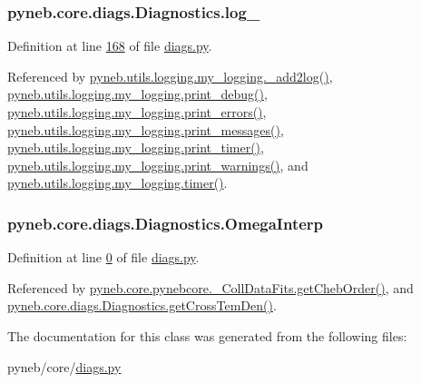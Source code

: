 \hypertarget{classpyneb_1_1core_1_1diags_1_1_diagnostics_a20b70abfa1fd458af2b797e06da01ed0}{
\subsubsection[{log\-\_\-}]{\setlength{\rightskip}{0pt plus 5cm}pyneb.\-core.\-diags.\-Diagnostics.\-log\-\_\-}}\label{classpyneb_1_1core_1_1diags_1_1_diagnostics_a20b70abfa1fd458af2b797e06da01ed0}


Definition at line \hyperlink{diags_8py_source_l00168}{168} of file \hyperlink{diags_8py_source}{diags.\-py}.



Referenced by \hyperlink{logging_8py_source_l00059}{pyneb.\-utils.\-logging.\-my\-\_\-logging.\-\_\-add2log()}, \hyperlink{logging_8py_source_l00157}{pyneb.\-utils.\-logging.\-my\-\_\-logging.\-print\-\_\-debug()}, \hyperlink{logging_8py_source_l00149}{pyneb.\-utils.\-logging.\-my\-\_\-logging.\-print\-\_\-errors()}, \hyperlink{logging_8py_source_l00133}{pyneb.\-utils.\-logging.\-my\-\_\-logging.\-print\-\_\-messages()}, \hyperlink{logging_8py_source_l00165}{pyneb.\-utils.\-logging.\-my\-\_\-logging.\-print\-\_\-timer()}, \hyperlink{logging_8py_source_l00141}{pyneb.\-utils.\-logging.\-my\-\_\-logging.\-print\-\_\-warnings()}, and \hyperlink{logging_8py_source_l00115}{pyneb.\-utils.\-logging.\-my\-\_\-logging.\-timer()}.

\hypertarget{classpyneb_1_1core_1_1diags_1_1_diagnostics_acfd0638b293790832bcee3cd9f3ec342}{
\subsubsection[{Omega\-Interp}]{\setlength{\rightskip}{0pt plus 5cm}pyneb.\-core.\-diags.\-Diagnostics.\-Omega\-Interp}}\label{classpyneb_1_1core_1_1diags_1_1_diagnostics_acfd0638b293790832bcee3cd9f3ec342}


Definition at line \hyperlink{diags_8py_source_l00000}{0} of file \hyperlink{diags_8py_source}{diags.\-py}.



Referenced by \hyperlink{pynebcore_8py_source_l00711}{pyneb.\-core.\-pynebcore.\-\_\-\-Coll\-Data\-Fits.\-get\-Cheb\-Order()}, and \hyperlink{diags_8py_source_l00554}{pyneb.\-core.\-diags.\-Diagnostics.\-get\-Cross\-Tem\-Den()}.



The documentation for this class was generated from the following files\-:\begin{DoxyCompactItemize}
\item 
pyneb/core/\hyperlink{diags_8py}{diags.\-py}\end{DoxyCompactItemize}
